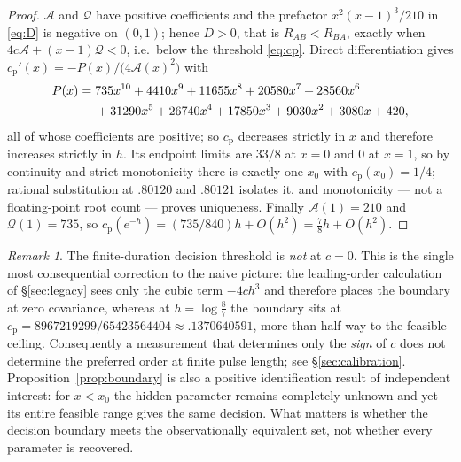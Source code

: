 \documentclass[11pt]{article}
\theoremstyle{plain}
\theoremstyle{definition}
\theoremstyle{remark}
\newtheorem{remark}[theorem]{Remark}
\newcommand{\cp}{c_{\mathrm p}}
\begin{document}
\begin{proof}
$\mathcal A$ and $\mathcal Q$ have positive coefficients and the prefactor
$x^2(x-1)^3/210$ in \eqref{eq:D} is negative on $(0,1)$; hence $D>0$, that is
$R_{AB}<R_{BA}$, exactly when $4c\mathcal A+(x-1)\mathcal Q<0$, i.e.\ below the
threshold \eqref{eq:cp}. Direct differentiation gives
$\cp'(x)=-P(x)/\bigl(4\mathcal A(x)^2\bigr)$ with
\begin{align}\label{eq:P}
 P(x)={}&735x^{10}+4410x^{9}+11655x^{8}+20580x^{7}+28560x^{6}\notag\\
 &+31290x^{5}+26740x^{4}+17850x^{3}+9030x^{2}+3080x+420 ,
\end{align}
all of whose coefficients are positive; so $\cp$ decreases strictly in $x$ and
therefore increases strictly in $h$. Its endpoint limits are $33/8$ at $x=0$
and $0$ at $x=1$, so by continuity and strict monotonicity there is exactly one
$x_0$ with $\cp(x_0)=1/4$; rational substitution at $.80120$ and $.80121$
isolates it, and monotonicity --- not a floating-point root count --- proves
uniqueness. Finally $\mathcal A(1)=210$ and $\mathcal Q(1)=735$, so
$\cp(e^{-h})=(735/840)h+O(h^2)=\tfrac78h+O(h^2)$.
\end{proof}

\begin{remark}\label{rem:positive}
The finite-duration decision threshold is \emph{not} at $c=0$. This is the
single most consequential correction to the naive picture: the leading-order
calculation of \S\ref{sec:legacy} sees only the cubic term $-4ch^3$ and
therefore places the boundary at zero covariance, whereas at $h=\log\frac87$
the boundary sits at $\cp=8967219299/65423564404\approx.1370640591$, more than
half way to the feasible ceiling. Consequently a measurement that determines
only the \emph{sign} of $c$ does not determine the preferred order at finite
pulse length; see \S\ref{sec:calibration}. Proposition~\ref{prop:boundary} is
also a positive identification result of independent interest: for $x<x_0$ the
hidden parameter remains completely unknown and yet its entire feasible range
gives the same decision. What matters is whether the decision boundary meets
the observationally equivalent set, not whether every parameter is recovered.
\end{remark}
\end{document}
